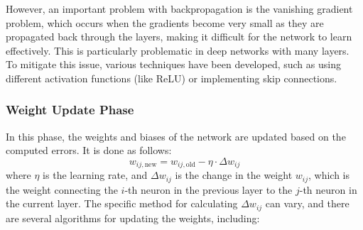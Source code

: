 However, an important problem with backpropagation is the vanishing gradient problem, which occurs when the gradients become very small as they are propagated back through the layers, making it difficult for the network to learn effectively. This is particularly problematic in deep networks with many layers. To mitigate this issue, various techniques have been developed, such as using different activation functions (like ReLU) or implementing skip connections.

\subsubsection{Weight Update Phase}
In this phase, the weights and biases of the network are updated based on the computed errors. It is done as follows:
\begin{equation*}
    w_{ij,\text{new}} = w_{ij,\text{old}} - \eta \cdot \Delta w_{ij}
\end{equation*}
where $\eta$ is the learning rate, and $\Delta w_{ij}$ is the change in the weight $w_{ij}$, which is the weight connecting the $i$-th neuron in the previous layer to the $j$-th neuron in the current layer. The specific method for calculating $\Delta w_{ij}$ can vary, and there are several algorithms for updating the weights, including:

